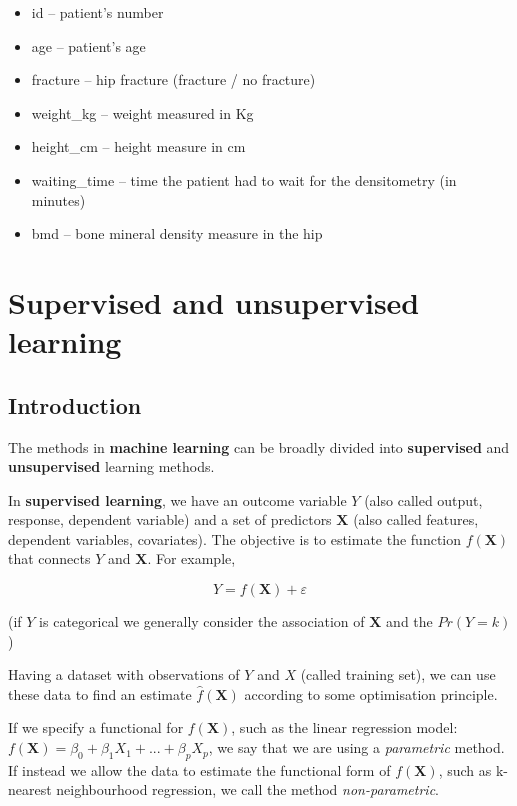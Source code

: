 \documentclass[
]{book}
\providecommand{\tightlist}{%
  \setlength{\itemsep}{0pt}\setlength{\parskip}{0pt}}
\begin{document}
\begin{itemize}
\tightlist
\item
  id -- patient's number
\item
  age -- patient's age
\item
  fracture -- hip fracture (fracture / no fracture)
\item
  weight\_kg -- weight measured in Kg
\item
  height\_cm -- height measure in cm
\item
  waiting\_time -- time the patient had to wait for the densitometry (in minutes)
\item
  bmd -- bone mineral density measure in the hip
\end{itemize}

\chapter{Supervised and unsupervised learning}\label{supervised-and-unsupervised-learning}

\section{Introduction}\label{introduction}

The methods in \textbf{machine learning} can be broadly divided into \textbf{supervised} and
\textbf{unsupervised} learning methods.

In \textbf{supervised learning}, we have an outcome variable \(Y\) (also called output,
response, dependent variable) and a set of predictors \(\mathbf{X}\) (also called
features, dependent variables, covariates). The objective is to estimate
the function \(f(\mathbf{X})\) that connects \(Y\) and \(\mathbf{X}\). For example,

\[
Y = f(\mathbf{X}) + \varepsilon
\]

(if \(Y\) is categorical we generally consider the association of \(\mathbf{X}\) and
the \(Pr(Y=k)\))

Having a dataset with observations of \(Y\) and \(X\) (called training set), we can
use these data to find an estimate \(\hat f(\mathbf{X})\) according to some
optimisation principle.

If we specify a functional for \(f(\mathbf{X})\), such as the linear regression
model:\(f(\mathbf{X}) = \beta_0 + \beta_1X_1 + ... + \beta_p X_p\), we say that
we are using a \emph{parametric} method. If instead we allow the data to estimate
the functional form of \(f(\mathbf{X})\), such as k-nearest neighbourhood
regression, we call the method \emph{non-parametric}.
\end{document}
